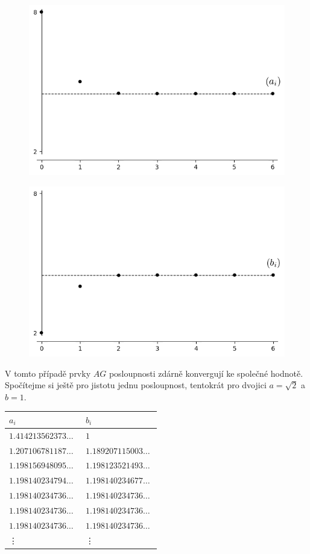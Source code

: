 \documentclass[12pt]{report}
\begin{document}
\begin{priklad}
\begin{figure}[h]
\centering
\begin{minipage}{.5\textwidth}
  \centering
  \includegraphics[width=.9\linewidth]{Ai2.png}
  \label{složka $(a_i)$}
\end{minipage}%
\begin{minipage}{.5\textwidth}
  \centering
  \includegraphics[width=.9\linewidth]{Bi2.png}
  \label{složka $(b_i)$}
\end{minipage}
\end{figure}
V tomto případě prvky $AG$ posloupnosti zdárně konvergují ke společné hodnotě. Spočítejme si ještě pro jistotu jednu posloupnost, tentokrát pro dvojici $a=\sqrt{2}$ a $b=1$.

\begin{longtable}[H]{>{\raggedright\arraybackslash}p{0.3\linewidth}p{0.202\linewidth}}
\toprule
$a_i$ & $b_i$\\
\midrule
$1.414213562373\dots$ & $1$\\
$1.207106781187\dots$ & $1.189207115003\dots$\\
$1.198156948095\dots$ & $1.198123521493\dots$\\
$1.198140234794\dots$ & $1.198140234677\dots$\\
$1.198140234736\dots$ & $1.198140234736\dots$\\
$1.198140234736\dots$&  $1.198140234736\dots$\\
$1.198140234736\dots$&  $1.198140234736\dots$\\
\vdots & \vdots\\
\bottomrule 
\end{longtable}
\end{priklad}
\end{document}
